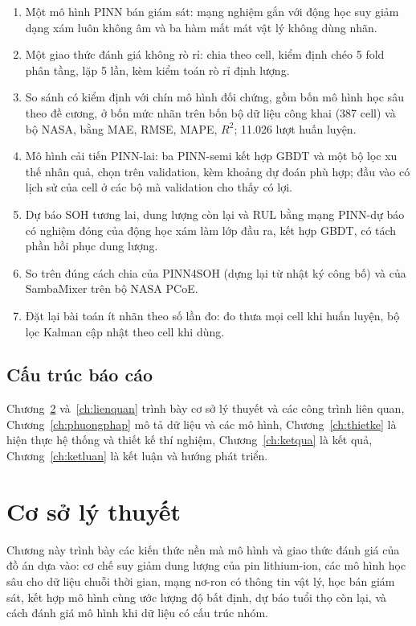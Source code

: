 \documentclass[12pt,a4paper,oneside]{report}
\theoremstyle{plain}
\theoremstyle{definition}
\begin{document}
\begin{enumerate}
\item Một mô hình PINN bán giám sát: mạng nghiệm gắn với động học suy giảm dạng xám luôn không âm và ba hàm mất mát
      vật lý không dùng nhãn.
\item Một giao thức đánh giá không rò rỉ: chia theo cell, kiểm định chéo 5 fold phân tầng, lặp 5 lần, kèm kiểm
      toán rò rỉ định lượng.
\item So sánh có kiểm định với chín mô hình đối chứng, gồm bốn mô hình học sâu theo đề cương, ở bốn mức nhãn trên
      bốn bộ dữ liệu công khai (387 cell) và bộ NASA, bằng MAE, RMSE, MAPE, $R^2$; 11.026 lượt huấn luyện.
\item Mô hình cải tiến PINN-lai: ba PINN-semi kết hợp GBDT và một bộ lọc xu thế nhân quả, chọn trên validation, kèm
      khoảng dự đoán phù hợp; đầu vào có lịch sử của cell ở các bộ mà validation cho thấy có lợi.
\item Dự báo SOH tương lai, dung lượng còn lại và RUL bằng mạng PINN-dự báo có nghiệm đóng của động học xám làm lớp đầu
      ra, kết hợp GBDT, có tách phần hồi phục dung lượng.
\item So trên đúng cách chia của PINN4SOH (dựng lại từ nhật ký công bố) và của SambaMixer trên bộ NASA PCoE.
\item Đặt lại bài toán ít nhãn theo số lần đo: đo thưa mọi cell khi huấn luyện, bộ lọc Kalman cập nhật theo cell khi
      dùng.
\end{enumerate}

\section{Cấu trúc báo cáo}

Chương~\ref{ch:lythuyet} và~\ref{ch:lienquan} trình bày cơ sở lý thuyết và các công trình liên quan,
Chương~\ref{ch:phuongphap} mô tả dữ liệu và các mô hình, Chương~\ref{ch:thietke} là hiện thực hệ thống và thiết kế
thí nghiệm,
Chương~\ref{ch:ketqua} là kết quả, Chương~\ref{ch:ketluan} là kết luận và hướng phát triển.
\chapter{Cơ sở lý thuyết}\label{ch:lythuyet}

Chương này trình bày các kiến thức nền mà mô hình và giao thức đánh giá của đồ án dựa vào: cơ chế suy giảm dung
lượng của pin lithium-ion, các mô hình học sâu cho dữ liệu chuỗi thời gian, mạng nơ-ron có thông tin vật lý, học bán
giám sát, kết hợp mô hình cùng ước lượng độ bất định, dự báo tuổi thọ còn lại, và cách đánh giá mô hình khi dữ liệu
có cấu trúc nhóm.
\end{document}
